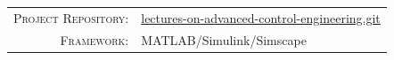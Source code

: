 \documentclass[12pt,a4paper,oneside]{book}
\newcommand{\MetaLabelA}{Project Repository}
\newcommand{\MetaValueAUrl}{https://github.com/pwr-control/lectures-on-advanced-control-engineering.git}
\newcommand{\MetaValueALabel}{lectures-on-advanced-control-engineering.git}
\newcommand{\MetaLabelB}{Framework}
\newcommand{\MetaValueB}{MATLAB/Simulink/Simscape}
\newcommand{\MetaLabelC}{Architecture}
\newcommand{\MetaValueC}{SiC, EiceDRIVER, Customized Power Supplies}
\begin{document}
	\vfill
	
	\noindent
	\begin{tabular}{@{} r @{\quad} l @{}}
		\textsc{\MetaLabelA:} & {\href{\MetaValueAUrl}{\MetaValueALabel}} \\[3pt]
		\textsc{\MetaLabelB:} & {\MetaValueB}       \\[3pt]
	\end{tabular}
	
	\newpage
	\setcounter{page}{1}
	\tableofcontents
	\listoffigures	
	\listoftables
	\newpage
	
\end{document}

